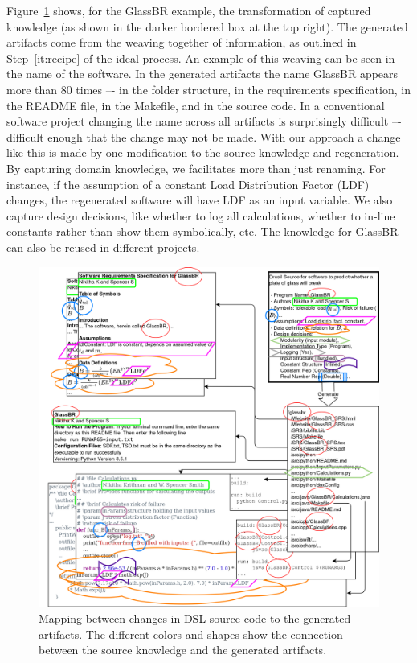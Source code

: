 \documentclass[sigconf,review]{acmart}
\begin{document}
Figure~\ref{Fig_DrasilAndChange} shows, for the GlassBR example, the
transformation of captured knowledge (as shown in the darker bordered box at the
top right). The generated artifacts come from the weaving together of
information, as outlined in Step~\ref{it:recipe} of the ideal process.  An
example of this weaving can be seen in the name of the software.  In the
generated artifacts the name GlassBR appears more than 80 times –- in the folder
structure, in the requirements specification, in the README file, in the
Makefile, and in the source code. In a conventional software project changing
the name across all artifacts is surprisingly difficult –- difficult enough that
the change may not be made. With our approach a change like this is made by one
modification to the source knowledge and regeneration. By capturing domain
knowledge, we facilitates more than just renaming. For instance, if the
assumption of a constant Load Distribution Factor (LDF) changes, the regenerated
software will have LDF as an input variable. We also capture design decisions,
like whether to log all calculations, whether to in-line constants rather than
show them symbolically, etc. The knowledge for GlassBR can also be reused in
different projects.

\begin{figure}[h]
  \centering
  \includegraphics[width=\linewidth]{assets/DrasilSupportsChange-right-portrait-overlapped-ungrouped-11ptFont-v1-300dpi.png}
  \caption{Mapping between changes in DSL source code to the generated
  artifacts. The different colors and shapes show the connection between the
  source knowledge and the generated artifacts.}
  \label{Fig_DrasilAndChange}
\end{figure}
\end{document}
